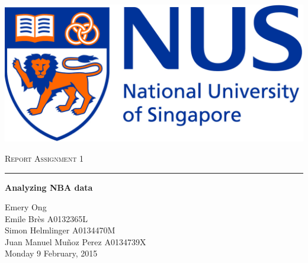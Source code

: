 
\begin{center}
	\begin{flushleft}
		\includegraphics[scale=0.1]{images/NUS.jpg}
		
	\end{flushleft}
	
	
	\vskip 5cm
	{\LARGE\textsc{Report Assignment 1}}\\
	\noindent\rule{4cm}{0.2pt}
	\vskip 0.5cm
	{\LARGE\textbf{Analyzing NBA data}}
	\vskip 4.5cm
	
	\LARGE{Emery Ong }\\
	\LARGE{Emile Br\`es A0132365L}\\
	\LARGE{Simon Helmlinger A0134470M}\\
	\LARGE{Juan Manuel Mu\~noz Perez A0134739X}\\
	
	\vspace{1.0cm}
	\Large{Monday 9 February, 2015}
	
	\vspace{2.cm}
	
\end{center}
